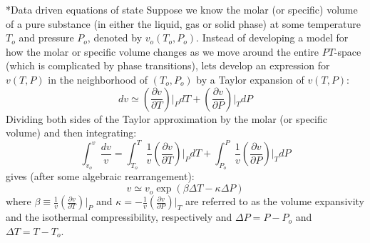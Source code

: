 \documentclass[11pt]{article}
\makeatletter
\theoremstyle{definition}
\renewcommand\subsubsection{\@startsection
	{subsubsection}{2}{0mm}
	{-0.05in}
	{-0.5\baselineskip}
	{\normalfont\normalsize\bfseries}}
\makeatother
\begin{document}
\clearpage



\subsubsection*{Data driven equations of state}
Suppose we know the molar (or specific) volume of a pure substance (in either the liquid, gas or solid phase) at some temperature $T_{o}$ and pressure $P_{o}$, denoted by $v_{o}(T_{o},P_{o})$.
Instead of developing a model for how the molar or specific volume changes as we move around the entire $PT$-space (which is complicated by phase transitions), lets develop an expression for $v(T,P)$ in the neighborhood of $(T_{o},P_{o})$ by a Taylor expansion of $v(T,P)$:
\begin{equation}
  \displaystyle dv \simeq \left(\frac{\partial v}{\partial T}\right)\Bigr|_{P}dT + \left(\frac{\partial v}{\partial P}\right)\Bigr|_{T}dP
\end{equation}
Dividing both sides of the Taylor approximation by the molar (or specific volume) and then integrating:
\begin{equation}
  \displaystyle \int_{v_{o}}^{v}\frac{dv}{v} = \int_{T_{o}}^{T} \frac{1}{v}\left(\frac{\partial v}{\partial T}\right)\Bigr|_{P}dT+\int_{P_{o}}^{P}\frac{1}{v}\left(\frac{\partial v}{\partial P}\right)\Bigr|_{T}dP
\end{equation}
gives (after some algebraic rearrangement):
\begin{equation}
\displaystyle v \simeq v_{o}\exp\left(\beta\Delta{T}-\kappa\Delta{P}\right)
\end{equation}
where $\beta\equiv\frac{1}{v}\left(\frac{\partial v}{\partial T}\right)\Bigr|_{P}$ and $\kappa = -\frac{1}{v}\left(\frac{\partial v}{\partial P}\right)\Bigr|_{T}$ are referred to as the volume expansivity and the isothermal compressibility,
respectively and $\Delta{P}=P-P_{o}$ and $\Delta{T}=T-T_{o}$.

\clearpage
\end{document}
